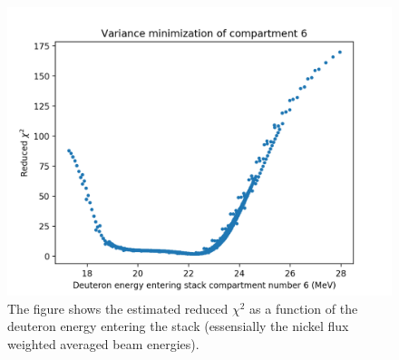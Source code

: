 \begin{figure}
    \centering
    \includegraphics{Analysis/chisquared_comp6.png}
    \caption{The figure shows the estimated reduced $\chi^2$ as a function of the deuteron energy entering the stack (essensially the nickel flux weighted averaged beam energies).}
    \label{fig:chisq_curve}
\end{figure}

